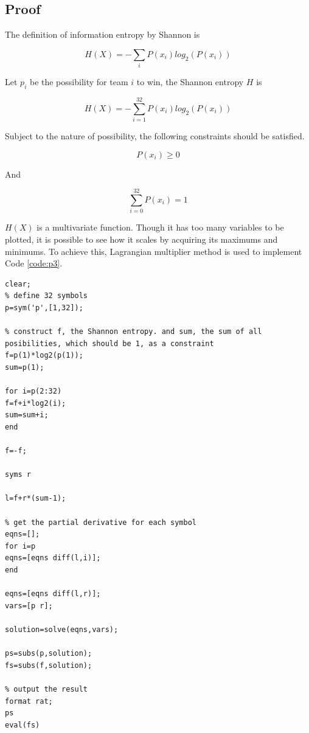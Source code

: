 \documentclass[12pt]{article}
\begin{document}
\subsection{Proof}

The definition of information entropy by Shannon is

\begin{equation}
	H(X)=-\sum_{i}P(x_i)log_2(P(x_i))
\end{equation}

Let $p_i$ be the possibility for team $i$ to win, the Shannon entropy $H$ is

\begin{equation}
	H(X)=-\sum_{i=1}^{32}P(x_i)log_2(P(x_i))
\end{equation}

Subject to the nature of possibility, the following constraints should be satisfied.

\begin{equation}
	P(x_i) \ge 0
\end{equation}

And

\begin{equation}
	\sum_{i=0}^{32}P(x_i) = 1
\end{equation}

$H(X)$ is a multivariate function. Though it has too many variables to be plotted, it is possible to see how it scales by acquiring its maximums and minimums. To achieve this, Lagrangian multiplier method is used to implement Code \ref{code:p3}.

\begin{lstlisting}[style=MatlabStyle,caption=Get the maximum for $H(x)$,label=code:p3]
clear;
% define 32 symbols
p=sym('p',[1,32]);

% construct f, the Shannon entropy. and sum, the sum of all posibilities, which should be 1, as a constraint
f=p(1)*log2(p(1));
sum=p(1);

for i=p(2:32)
f=f+i*log2(i);
sum=sum+i;
end

f=-f;

syms r

l=f+r*(sum-1);

% get the partial derivative for each symbol
eqns=[];
for i=p
eqns=[eqns diff(l,i)];
end

eqns=[eqns diff(l,r)];
vars=[p r];

solution=solve(eqns,vars);

ps=subs(p,solution);
fs=subs(f,solution);

% output the result
format rat;
ps
eval(fs)
\end{lstlisting}
\end{document}

